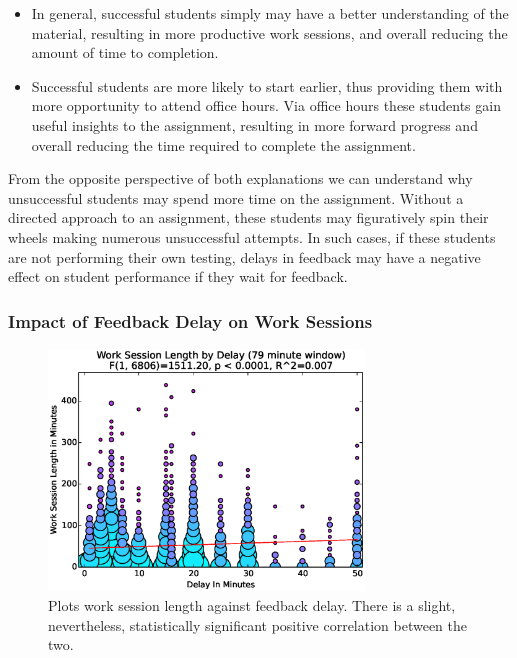 \begin{itemize}
\item In general, successful students simply may have a better understanding of
  the material, resulting in more productive work sessions, and overall
  reducing the amount of time to completion.
\item Successful students are more likely to start earlier, thus providing them
  with more opportunity to attend office hours. Via office hours these students
  gain useful insights to the assignment, resulting in more forward progress
  and overall reducing the time required to complete the assignment.
\end{itemize}

From the opposite perspective of both explanations we can understand why
unsuccessful students may spend more time on the assignment. Without a directed
approach to an assignment, these students may figuratively spin their wheels
making numerous unsuccessful attempts. In such cases, if these students are not
performing their own testing, delays in feedback may have a negative effect on
student performance if they wait for feedback.


\subsubsection{Impact of Feedback Delay on Work Sessions}

\begin{figure}[!t]
\centering
\includegraphics[width=3.3in]{graphs/Work_Session_Length_by_Delay_(79_minute_window).eps}
\caption{Plots work session length against feedback delay. There is a slight,
  nevertheless, statistically significant positive correlation between the
  two.}
\end{figure}

